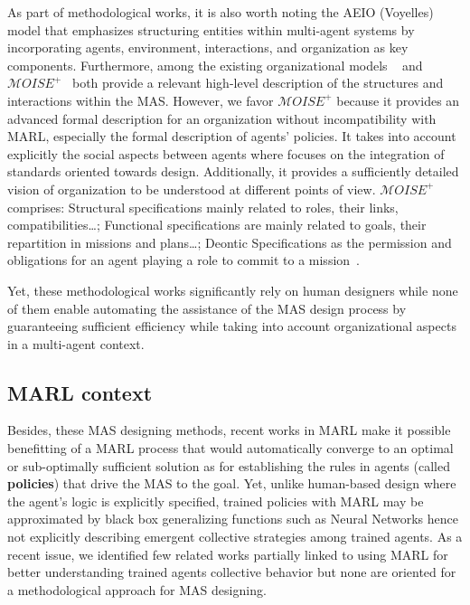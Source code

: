 \documentclass[runningheads]{llncs}
\begin{document}
As part of methodological works, it is also worth noting the AEIO (Voyelles) model that emphasizes structuring entities within multi-agent systems by incorporating agents, environment, interactions, and organization as key components.
Furthermore, among the existing organizational models ~\cite{Ferber2004} and \allowbreak $\mathcal{M}OISE^+$~\cite{Hubner2002} both provide a relevant high-level description of the structures and interactions within the MAS. However, we favor $\mathcal{M}OISE^+$ because it provides an advanced formal description for an organization without incompatibility with MARL, especially the formal description of agents' policies. It takes into account explicitly the social aspects between agents where  focuses on the integration of standards oriented towards design. Additionally, it provides a sufficiently detailed vision of organization to be understood at different points of view. $\mathcal{M}OISE^+$ comprises: Structural specifications mainly related to roles, their links, compatibilities\dots; Functional specifications are mainly related to goals, their repartition in missions and plans\dots; Deontic Specifications as the permission and obligations for an agent playing a role to commit to a mission~\cite{Hubner2002}.

Yet, these methodological works significantly rely on human designers while none of them enable automating the assistance of the MAS design process by guaranteeing sufficient efficiency while taking into account organizational aspects in a multi-agent context.

\subsection{MARL context}

Besides, these MAS designing methods, recent works in MARL make it possible benefitting of a MARL process that would automatically converge to an optimal or sub-optimally sufficient solution as for establishing the rules in agents (called \textbf{policies}) that drive the MAS to the goal. Yet, unlike human-based design where the agent's logic is explicitly specified, trained policies with MARL may be approximated by black box generalizing functions such as Neural Networks hence not explicitly describing emergent collective strategies among trained agents.
As a recent issue, we identified few related works partially linked to using MARL for better understanding trained agents collective behavior but none are oriented for a methodological approach for MAS designing.
\end{document}

